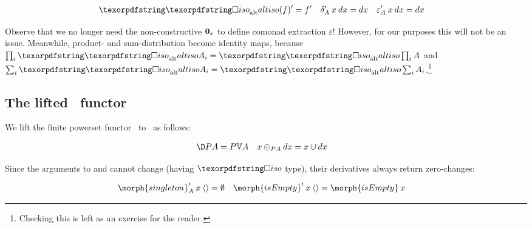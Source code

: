 \documentclass{rntz}\usepackage{fantasy}%
\begin{document}
\nopagebreak[2]
\begin{align*}
  \deriv{\altiso(f)} &= \deriv f
  & \deriv\delta_A \<x\<\dx &= \dx
  & \deriv\varepsilon_A \<x\<\dx &= \dx
\end{align*}

\noindent
Observe that we no longer need the non-constructive $\boldsymbol{0}_x$ to define comonad
extraction $\varepsilon$! However, for our purposes this will not be an issue.
Meanwhile, product- and sum-distribution become identity maps, because $\prod_i
\altiso A_i = \altiso \prod_i A$ and $\sum_i \altiso A_i = \altiso \sum_i
A_i$.\footnote{Checking this is left as an exercise for the reader.}


\subsection{The lifted \pfin\ functor}
\label{sec:CP-pfin}

We lift the finite powerset functor \pfin\ to \CP\ as follows:

\nopagebreak[2]
\begin{align}
  \chgs{\pfinof A} &= \pfinof{\vals A} &
  x \upd_{\pfinof A} \dx &= x \cup \dx
  \label{eqn:CP-pfin}
\end{align}

\noindent
Since the arguments to  and  cannot change
(having $\iso$ type), their derivatives always return zero-changes:

\nopagebreak[2]
\begin{align*}
  \deriv{\morph{singleton}}_A \<x \<\tuple{} &= \emptyset &
  \deriv{\morph{isEmpty}} \<x \<\tuple{} &= \morph{isEmpty} \< x
\end{align*}





\end{document}
